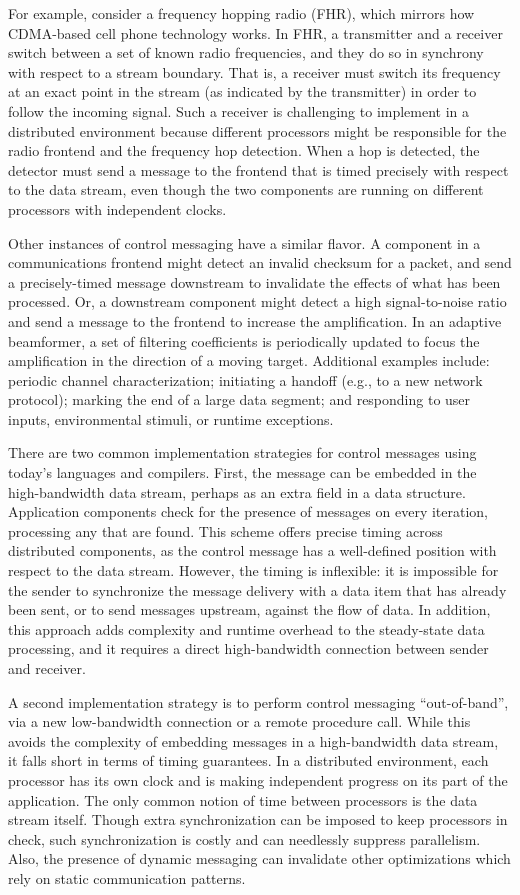 For example, consider a frequency hopping radio (FHR), which mirrors
how CDMA-based cell phone technology works.  In FHR, a transmitter and
a receiver switch between a set of known radio frequencies, and they
do so in synchrony with respect to a stream boundary. That is, a
receiver must switch its frequency at an exact point in the stream (as
indicated by the transmitter) in order to follow the incoming signal.
Such a receiver is challenging to implement in a distributed
environment because different processors might be responsible for the
radio frontend and the frequency hop detection.  When a hop is
detected, the detector must send a message to the frontend that is
timed precisely with respect to the data stream, even though the two
components are running on different processors with independent
clocks.

Other instances of control messaging have a similar flavor.  A
component in a communications frontend might detect an invalid
checksum for a packet, and send a precisely-timed message downstream
to invalidate the effects of what has been processed.  Or, a
downstream component might detect a high signal-to-noise ratio and
send a message to the frontend to increase the amplification.  In an
adaptive beamformer, a set of filtering coefficients is periodically
updated to focus the amplification in the direction of a moving
target.  Additional examples include: periodic channel
characterization; initiating a handoff (e.g., to a new network
protocol); marking the end of a large data segment; and responding to
user inputs, environmental stimuli, or runtime exceptions.

There are two common implementation strategies for control messages
using today's languages and compilers.  First, the message can be
embedded in the high-bandwidth data stream, perhaps as an extra field
in a data structure.  Application components check for the presence of
messages on every iteration, processing any that are found.  This
scheme offers precise timing across distributed components, as the
control message has a well-defined position with respect to the data
stream.  However, the timing is inflexible: it is impossible for the
sender to synchronize the message delivery with a data item that has
already been sent, or to send messages upstream, against the flow of
data.  In addition, this approach adds complexity and runtime overhead
to the steady-state data processing, and it requires a direct
high-bandwidth connection between sender and receiver.

A second implementation strategy is to perform control messaging
``out-of-band'', via a new low-bandwidth connection or a remote
procedure call.  While this avoids the complexity of embedding
messages in a high-bandwidth data stream, it falls short in terms of
timing guarantees.  In a distributed environment, each processor has
its own clock and is making independent progress on its part of the
application.  The only common notion of time between processors is the
data stream itself.  Though extra synchronization can be imposed to
keep processors in check, such synchronization is costly and can
needlessly suppress parallelism.  Also, the presence of dynamic
messaging can invalidate other optimizations which rely on static
communication patterns.

